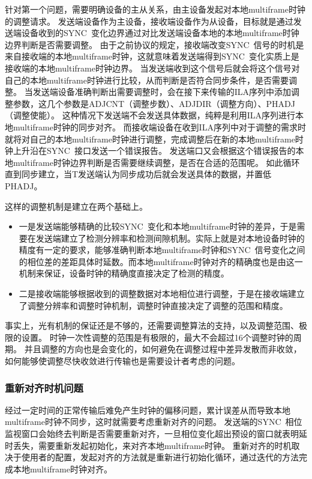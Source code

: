 \documentclass[UTF8]{ctexart}
\begin{document}
针对第一个问题，需要明确设备的主从关系，由主设备发起对本地multiframe时钟的调整请求。
发送端设备作为主设备，接收端设备作为从设备，目标就是通过发送端设备收到的SYNC~变化边界通过对比发送端设备本地的本地multiframe时钟边界判断是否需要调整。
由于之前协议的规定，接收端改变SYNC~信号的时机是来自接收端的本地multiframe时钟，这就意味着发送端得到SYNC~变化实质上是接收端的本地multiframe时钟边界。
当发送端收到这个信号后就会将这个信号对自己的本地multiframe时钟进行比较，从而判断是否符合同步条件，是否需要调整。
当发送端设备准确判断出需要调整时，会在接下来传输的ILA序列中添加调整参数，这几个参数是ADJCNT（调整步数）、ADJDIR（调整方向）、PHADJ（调整使能）。
这种情况下发送端不会发送具体数据，纯粹是利用ILA序列进行本地multiframe时钟的同步对齐。
而接收端设备在收到ILA序列中对于调整的需求时就将对自己的本地multiframe时钟进行调整，完成调整后在新的本地multiframe时钟上升沿在SYNC~接口发送一个错误报告。
发送端口又会根据这个错误报告的本地multiframe时钟边界判断是否需要继续调整，是否在合适的范围呢。
如此循环直到同步建立，当T发送端认为同步成功后就会发送具体的数据，并置低PHADJ。

这样的调整机制是建立在两个基础上。

\begin{itemize}
\item 一是发送端能够精确的比较SYNC~变化和本地multiframe时钟的差异，于是需要在发送端建立了检测分辨率和检测间隙机制。实际上就是对本地设备时钟的精度有一定的要求，能够准确判断本地multiframe时钟和SYNC~信号变化之间的相位差的差距具体时延数。而本地multiframe时钟对齐的精确度也是由这一机制来保证，设备时钟的精确度直接决定了检测的精度。
\item 二是接收端能够根据收到的调整数据对本地相位进行调整，于是在接收端建立了调整分辨率和调整时钟机制，调整时钟直接决定了调整的范围和精度。
\end{itemize}

事实上，光有机制的保证还是不够的，还需要调整算法的支持，以及调整范围、极限的设置。
时钟一次性调整的范围是有极限的，最大不会超过16个调整时钟的周期。
并且调整的方向也是会变化的，如何避免在调整过程中差异发散而非收敛，如何能够使调整尽快收敛进行传输也是需要设计者考虑的问题。

\subsubsection{重新对齐时机问题}

经过一定时间的正常传输后难免产生时钟的偏移问题，累计误差从而导致本地multiframe时钟不同步，这时就需要考虑重新对齐的问题。
发送端的SYNC~相位监视窗口会始终去判断是否需要重新对齐，一旦相位变化超出预设的窗口就表明延时丢失，需要重新发起初始化，来对齐本地multiframe时钟。
重新对齐的时机取决于使用者的配置，发起对齐的方法就是重新进行初始化循环，通过迭代的方法完成本地multiframe时钟对齐。


\end{document}
